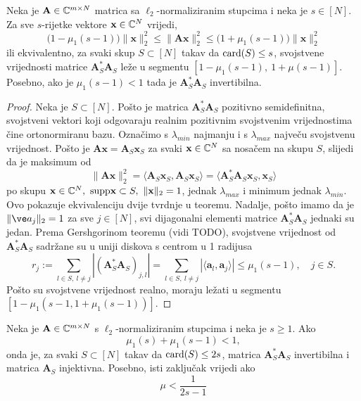 \documentclass[a4paper,twoside,12pt]{memoir} %
\newcommand{\vect}[1]{\mathbf{#1}}
\renewcommand{\vec}{\vect}
\newcommand{\card}{\text{\normalfont{card}}}
\newcommand{\supp}{\text{\normalfont{supp}}}
\newcommand{\norm}[1]{\|{#1}\|}
\begin{document}
\begin{thm}
    Neka je $\vec A \in \C^{m \times N}$ matrica sa $\ell_2$-normaliziranim stupcima i neka je $s \in [N]$. Za sve $s$-rijetke vektore $\vec x \in \C^N$ vrijedi,
    \begin{equation*}
        \big(1-\mu_1(s-1)\big) \norm{\vec x}_2^2 \leq \norm{\vec{Ax}}_2^2 \leq \big(1+\mu_1(s-1)\big) \norm{\vec x}_2^2
    \end{equation*}
    ili ekvivalentno, za svaki skup $S \subset [N]$ takav da $\card(S) \leq s$, svojstvene vrijednosti matrice $\vec A^*_S \vec A_S$ le\v{z}e u segmentu $[1-\mu_1(s-1),\ 1+\mu(s-1)]$. Posebno, ako je $\mu_1(s-1) < 1$ tada je $\vec A^*_S \vec A_S$ invertibilna.
\end{thm}
\begin{proof}
    Neka je $S \subset [N]$. Po\v{s}to je matrica $\vec A^*_S \vec A_S$ pozitivno semidefinitna, svojstveni vektori koji odgovaraju realnim pozitivnim svojstvenim vrijednostima \v{c}ine ortonormiranu bazu. Ozna\v{c}imo s $\lambda_{min}$ najmanju i s $\lambda_{max}$ najve\v{c}u svojstvenu vrijednost. Po\v{s}to je $\vec{Ax} = \vec A_S \vec x_S$ za svaki $\vec x \in \C^N$ sa nosa\v{c}em na skupu $S$, slijedi da je maksimum od
    \begin{equation*}
        \norm{\vec{Ax}}_2^2 = \langle \vec A_S \vec x_S, \vec A_S \vec x_S  \rangle = \langle \vec A^*_S \vec A_S \vec x_S, \vec x_S \rangle
    \end{equation*}
    po skupu ${\vec x \in \C^N,\ \supp \vec x \subset S,\ \norm{\vec x}_2 = 1}$, jednak $\lambda_{max}$ i minimum jednak $\lambda_{min}$. Ovo pokazuje ekvivalenciju dvije tvrdnje u teoremu. Nadalje, po\v{s}to imamo da je $\norm{\ve a_j}_2 = 1$ za sve $j \in [N]$, svi dijagonalni elementi matrice $\vec A^*_S \vec A_S$ jednaki su jedan. Prema Gershgorinom teoremu (vidi TODO), svojstvene vrijednost od $\vec A^*_S \vec A_S$ sadr\v{z}ane su u uniji diskova s centrom u 1 radijusa
    \begin{equation*}
        r_j := \sum_{l \in S,\ l \neq j} |(\vec A^*_S \vec A_S)_{j,l}| = \sum_{l \in S,\ l \neq j} |\langle \vec a_l, \vec a_j \rangle| \leq \mu_1 (s-1),\quad j \in S.
    \end{equation*}
    \newpage
    Po\v{s}to su svojstvene vrijednost realno, moraju le\v{z}ati u segmentu $[1-\mu_1(s-1, 1+ \mu_1(s-1))]$.
\end{proof}
\begin{cor}\label{kor:5:4}
    Neka je $\vec A \in \C^{m \times N}$ s $\ell_2$-normaliziranim stupcima i neka je $s \geq 1$. Ako  
    \begin{equation*}
        \mu_1(s) + \mu_1(s-1) < 1, 
    \end{equation*}
    onda je, za svaki $S \subset [N]$ takav da $\card(S) \leq 2s$, matrica $\vec A^*_S \vec A_S$ invertibilna i matrica $\vec A_S$ injektivna. Posebno, isti zaklju\v{c}ak vrijedi ako
    \begin{equation*}
        \mu < \frac{1}{2s - 1}  
    \end{equation*}
\end{cor}
\end{document}
